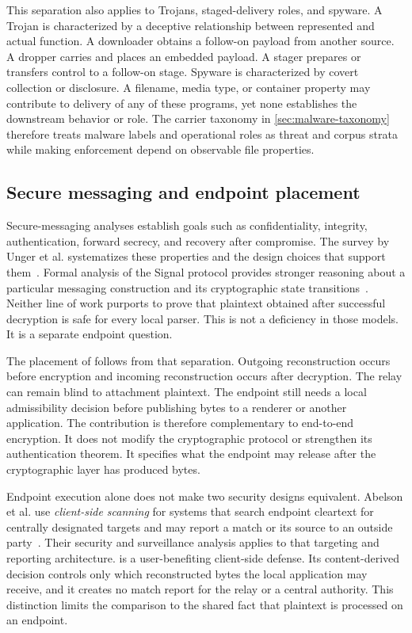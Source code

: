 This separation also applies to Trojans, staged-delivery roles, and spyware. A
Trojan is characterized by a deceptive relationship between represented and
actual function. A downloader obtains a follow-on payload from another source.
A dropper carries and places an embedded payload. A stager prepares or transfers
control to a follow-on stage. Spyware is characterized by covert collection or
disclosure. A filename, media type, or container property may contribute to
delivery of any of these programs, yet none establishes the downstream behavior
or role. The carrier taxonomy in \cref{sec:malware-taxonomy} therefore treats
malware labels and operational roles as threat and corpus strata while making
enforcement depend on observable file properties.

\subsection{Secure messaging and endpoint placement}

Secure-messaging analyses establish goals such as confidentiality, integrity,
authentication, forward secrecy, and recovery after compromise. The survey by
Unger et al. systematizes these properties and the design choices that support
them~\cite{unger2015}. Formal analysis of the Signal protocol provides stronger
reasoning about a particular messaging construction and its cryptographic
state transitions~\cite{cohngordon2020}. Neither line of work purports to prove
that plaintext obtained after successful decryption is safe for every local
parser. This is not a deficiency in those models. It is a separate endpoint
question.

The placement of \AFD{} follows from that separation. Outgoing reconstruction
occurs before encryption and incoming reconstruction occurs after decryption.
The relay can remain blind to attachment plaintext. The endpoint still needs a
local admissibility decision before publishing bytes to a renderer or another
application. The contribution is therefore complementary to end-to-end
encryption. It does not modify the cryptographic protocol or strengthen its
authentication theorem. It specifies what the endpoint may release after the
cryptographic layer has produced bytes.

Endpoint execution alone does not make two security designs equivalent.
Abelson et al. use \emph{client-side scanning} for systems that search endpoint
cleartext for centrally designated targets and may report a match or its source
to an outside party~\cite{abelson2024}. Their security and surveillance
analysis applies to that targeting and reporting architecture. \AFD{} is a
user-benefiting client-side defense. Its content-derived decision controls only
which reconstructed bytes the local application may receive, and it creates no
match report for the relay or a central authority. This distinction limits the
comparison to the shared fact that plaintext is processed on an endpoint.


